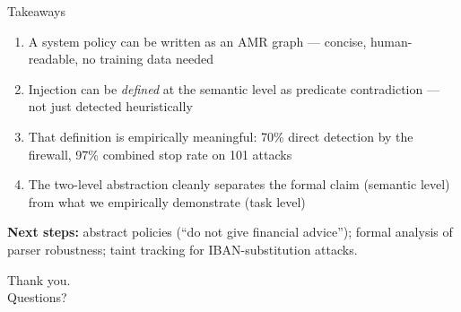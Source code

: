 \documentclass[aspectratio=169, 10pt]{beamer}
\begin{document}
\begin{frame}{Takeaways}

  \begin{enumerate}\setlength\itemsep{0.3em}
    \item A system policy can be written as an AMR graph —
          concise, human-readable, no training data needed

    \item Injection can be \emph{defined} at the semantic level
          as predicate contradiction — not just detected heuristically

    \item That definition is empirically meaningful:
          70\% direct detection by the firewall,
          97\% combined stop rate on 101 attacks

    \item The two-level abstraction cleanly separates the formal claim
          (semantic level) from what we empirically demonstrate
          (task level)
  \end{enumerate}

  \vspace{0.4em}
  \textbf{Next steps:} abstract policies (``do not give financial advice'');
  formal analysis of parser robustness;
  taint tracking for IBAN-substitution attacks.

\end{frame}


\begin{frame}[standout]
  Thank you.\\[0.5em]
  \normalsize Questions?
\end{frame}
\end{document}
